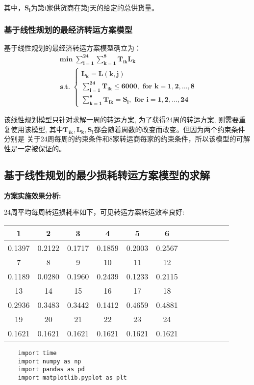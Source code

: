 \documentclass[UTF8]{ctexart}
\begin{document}
其中，$\mathbf{S_{i}}$为第i家供货商在第j天的给定的总供货量。
\subsubsection{基于线性规划的最经济转运方案模型}
基于线性规划的最经济转运方案模型确立为：
\begin{equation}
	\mathbf{\begin{array}{c}
	\min \sum_{i=1}^{24} \sum_{k=1}^{8} T_{i k} L_{k} \\
	\text { s.t. }\left\{\begin{array}{l}
	L_{k}=\bar{L}(k, j) \\
	\sum_{i=1}^{24} T_{i k} \leqslant 6000, \text { for } k=1,2, \ldots, 8 \\
	\sum_{k=1}^{8} T_{i k}=S_{i}, \text { for } i=1,2, \ldots, 24
	\end{array}\right.
	\end{array}}
\end{equation}

该线性规划模型只针对求解一周的转运方案, 为了获得24周的转运方案, 则需要重复使用该模型, 
其中$\mathbf{T_{ik},L_{k}, S_{i}}$都会随着周数的改变而改变。但因为两个约束条件分别是
关于24周每周的约束条件和8家转运商每家的约束条件，所以该模型的可解性是一定被保证的。

\subsection{基于线性规划的最少损耗转运方案模型的求解}
\textbf{方案实施效果分析:}

24周平均每周转运损耗率如下，可见转运方案转运效率良好:
\begin{center}
	\begin{tabular}{||c c c c c c c c c c c c||}
		\hline 
		1 & 2 & 3 & 4 & 5 & 6   \\
		\hline 
		0.1397 & 0.2122 & 0.1717 & 0.1859 & 0.2003 & 0.2567 \\
		\hline 
		7 & 8 & 9 & 10 & 11 & 12 \\
		\hline
		0.1189 & 0.0280 & 0.1960 & 0.2439 & 0.1233 & 0.2115 \\
		\hline 
		13 & 14 & 15 & 16 & 17 & 18 \\
		\hline 
		0.2936 & 0.3483 & 0.3442 & 0.1412 & 0.4659 & 0.4881 \\
		\hline 
		19 & 20 & 21 & 22 & 23 & 24 \\
		\hline 
		0.1621 & 0.1621 & 0.1621 & 0.1621 & 0.1621 & 0.1621 \\
		\hline
	\end{tabular}
\end{center}

\lstset{language=python}
\begin{lstlisting}
	import time
	import numpy as np
	import pandas as pd
	import matplotlib.pyplot as plt

		
\end{lstlisting}
\end{document}
